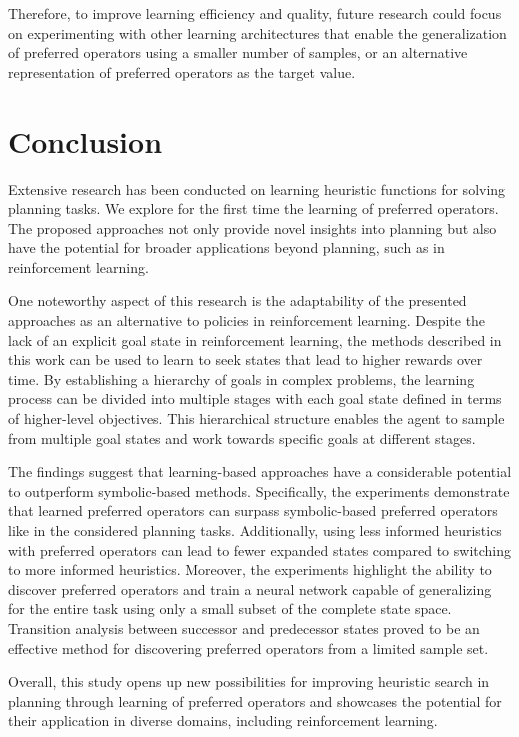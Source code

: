\documentclass[ppgc,diss,english]{iiufrgs}
\begin{document}
Therefore, to improve learning efficiency and quality, future research could focus on experimenting with other learning architectures that enable the generalization of preferred operators using a smaller number of samples, or an alternative representation of preferred operators as the target value.

\chapter{Conclusion}
\label{cha:conclusion}
Extensive research has been conducted on learning heuristic functions for solving planning tasks. We explore for the first time the learning of preferred operators. The proposed approaches not only provide novel insights into planning but also have the potential for broader applications beyond planning, such as in reinforcement learning.

One noteworthy aspect of this research is the adaptability of the presented approaches as an alternative to policies in reinforcement learning. Despite the lack of an explicit goal state in reinforcement learning, the methods described in this work can be used to learn to seek states that lead to higher rewards over time. By establishing a hierarchy of goals in complex problems, the learning process can be divided into multiple stages with each goal state defined in terms of higher-level objectives. This hierarchical structure enables the agent to sample from multiple goal states and work towards specific goals at different stages.

The findings suggest that learning-based approaches have a considerable potential to outperform symbolic-based methods. Specifically, the experiments demonstrate that learned preferred operators can surpass symbolic-based preferred operators like \poff in the considered planning tasks. Additionally, using less informed heuristics with preferred operators can lead to fewer expanded states compared to switching to more informed heuristics. Moreover, the experiments highlight the ability to discover preferred operators and train a neural network capable of generalizing for the entire task using only a small subset of the complete state space. Transition analysis between successor and predecessor states proved to be an effective method for discovering preferred operators from a limited sample set.

Overall, this study opens up new possibilities for improving heuristic search in planning through learning of preferred operators and showcases the potential for their application in diverse domains, including reinforcement learning.
\end{document}
